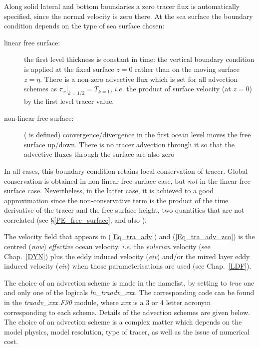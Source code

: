 \documentclass[NEMO_book]{subfiles}
\begin{document}
Along solid lateral and bottom boundaries a zero tracer flux is automatically 
specified, since the normal velocity is zero there. At the sea surface the 
boundary condition depends on the type of sea surface chosen: 
\begin{description}
\item [linear free surface:] the first level thickness is constant in time: 
the vertical boundary condition is applied at the fixed surface $z=0$ 
rather than on the moving surface $z=\eta$. There is a non-zero advective 
flux which is set for all advection schemes as 
$\left. {\tau _w } \right|_{k=1/2} =T_{k=1} $, $i.e.$ 
the product of surface velocity (at $z=0$) by the first level tracer value.
\item [non-linear free surface:] ( is defined) 
convergence/divergence in the first ocean level moves the free surface 
up/down. There is no tracer advection through it so that the advective 
fluxes through the surface are also zero 
\end{description}
In all cases, this boundary condition retains local conservation of tracer. 
Global conservation is obtained in non-linear free surface case, 
but \textit{not} in the linear free surface case. Nevertheless, in the latter case, 
it is achieved to a good approximation since the non-conservative 
term is the product of the time derivative of the tracer and the free surface 
height, two quantities that are not correlated (see \S\ref{PE_free_surface}, 
and also \citet{Roullet_Madec_JGR00,Griffies_al_MWR01,Campin2004}).

The velocity field that appears in (\ref{Eq_tra_adv}) and (\ref{Eq_tra_adv_zco}) 
is the centred (\textit{now}) \textit{effective} ocean velocity, $i.e.$ the \textit{eulerian} velocity
(see Chap.~\ref{DYN}) plus the eddy induced velocity (\textit{eiv}) 
and/or the mixed layer eddy induced velocity (\textit{eiv})
when those parameterisations are used (see Chap.~\ref{LDF}).

The choice of an advection scheme is made in the \textit{} namelist, by 
setting to \textit{true} one and only one of the logicals \textit{ln\_traadv\_xxx}. The 
corresponding code can be found in the \textit{traadv\_xxx.F90} module, where 
\textit{xxx} is a 3 or 4 letter acronym corresponding to each scheme. Details 
of the advection schemes are given below. The choice of an advection scheme 
is a complex matter which depends on the model physics, model resolution, 
type of tracer, as well as the issue of numerical cost. 
\end{document}

